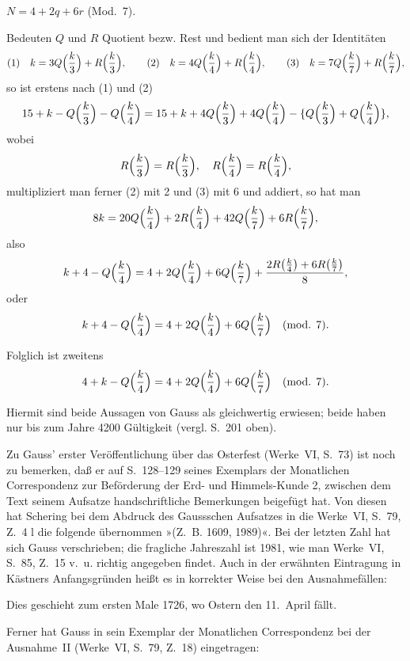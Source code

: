 \documentclass[12pt,a4paper]{article}
\theoremstyle{plain}
\theoremstyle{definition}
\theoremstyle{remark}
\begin{document}
\null\quad $N = 4 + 2q + 6r$ (Mod.~7).

Bedeuten $Q$ und $R$ Quotient bezw. Rest und bedient man sich der Identitäten
\[
\text{(1)}\quad k = 3Q\Bigl(\frac{k}{3}\Bigr) + R\Bigl(\frac{k}{3}\Bigr), \qquad
\text{(2)}\quad k = 4Q\Bigl(\frac{k}{4}\Bigr) + R\Bigl(\frac{k}{4}\Bigr), \qquad
\text{(3)}\quad k = 7Q\Bigl(\frac{k}{7}\Bigr) + R\Bigl(\frac{k}{7}\Bigr),
\]
so ist erstens nach (1) und (2)
\[
15 + k - Q\Bigl(\frac{k}{3}\Bigr) - Q\Bigl(\frac{k}{4}\Bigr) = 15 + k + 4Q\Bigl(\frac{k}{3}\Bigr) + 4Q\Bigl(\frac{k}{4}\Bigr) - \{Q\Bigl(\frac{k}{3}\Bigr) + Q\Bigl(\frac{k}{4}\Bigr)\},
\]
wobei
\[
R\Bigl(\frac{k}{3}\Bigr) = R\Bigl(\frac{k}{3}\Bigr), \quad R\Bigl(\frac{k}{4}\Bigr) = R\Bigl(\frac{k}{4}\Bigr),
\]
multipliziert man ferner (2) mit 2 und (3) mit 6 und addiert, so hat man
\[
8k = 20Q\Bigl(\frac{k}{4}\Bigr) + 2R\Bigl(\frac{k}{4}\Bigr) + 42Q\Bigl(\frac{k}{7}\Bigr) + 6R\Bigl(\frac{k}{7}\Bigr),
\]
also
\[
k + 4 - Q\Bigl(\frac{k}{4}\Bigr) = 4 + 2Q\Bigl(\frac{k}{4}\Bigr) + 6Q\Bigl(\frac{k}{7}\Bigr) + \frac{2R\bigl(\frac{k}{4}\bigr) + 6R\bigl(\frac{k}{7}\bigr)}{8},
\]
oder
\[
k + 4 - Q\Bigl(\frac{k}{4}\Bigr) = 4 + 2Q\Bigl(\frac{k}{4}\Bigr) + 6Q\Bigl(\frac{k}{7}\Bigr) \quad \text{(mod. 7)}.
\]

Folglich ist zweitens
\[
4 + k - Q\Bigl(\frac{k}{4}\Bigr) = 4 + 2Q\Bigl(\frac{k}{4}\Bigr) + 6Q\Bigl(\frac{k}{7}\Bigr) \quad \text{(mod. 7)}.
\]

Hiermit sind beide Aussagen von Gauss als gleichwertig erwiesen; beide haben nur bis zum Jahre 4200 Gültigkeit (vergl. S.~201 oben).

Zu Gauss' erster Veröffentlichung über das Osterfest (Werke~VI, S.~73) ist noch zu bemerken, daß er auf S.~128--129 seines Exemplars der Monatlichen Correspondenz zur Beförderung der Erd- und Himmels-Kunde 2, zwischen dem Text seinem Aufsatze handschriftliche Bemerkungen beigefügt hat. Von diesen hat Schering bei dem Abdruck des Gaussschen Aufsatzes in die Werke~VI, S.~79, Z.~4 l die folgende übernommen »(Z.~B. 1609, 1989)«. Bei der letzten Zahl hat sich Gauss verschrieben; die fragliche Jahreszahl ist 1981, wie man Werke~VI, S.~85, Z.~15 v.~u. richtig angegeben findet. Auch in der erwähnten Eintragung in Kästners Anfangsgründen heißt es in korrekter Weise bei den Ausnahmefällen:

\null\quad Dies geschieht zum ersten Male 1726, wo Ostern den 11.~April fällt.

Ferner hat Gauss in sein Exemplar der Monatlichen Correspondenz bei der Ausnahme~II (Werke~VI, S.~79, Z.~18) eingetragen:
\end{document}
